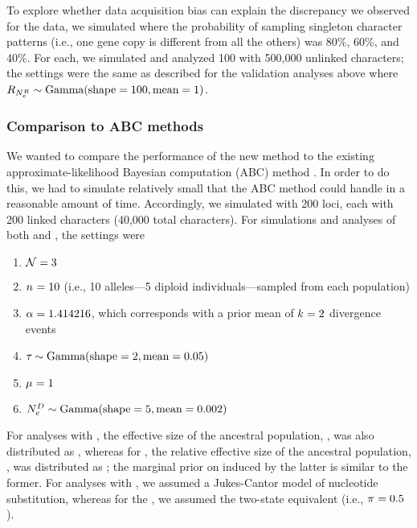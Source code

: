 To explore whether data acquisition bias can explain the discrepancy we
observed for the  data, we simulated \datasets where the probability
of sampling singleton character patterns (i.e., one gene copy is different from
all the others) was 80\%, 60\%, and 40\%.
For each, we simulated and analyzed 100 \datasets with 500,000 unlinked
characters; the settings were the same as described for the validation analyses
above where
$\rootrelativepopsize \sim \dgamma{100}{1}$.


\subsubsection{Comparison to ABC methods}
We wanted to compare the performance of the new method to the existing
approximate-likelihood Bayesian computation (ABC) method \dppmsbayes 
\citep{Oaks2014dpp}.
In order to do this, we had to simulate relatively small \datasets that the ABC
method could handle in a reasonable amount of time.
Accordingly, we simulated \datasets with 200 loci, each with 200 linked
characters (40,000 total characters).
For simulations and analyses of both \ecoevolity and \dppmsbayes, the settings
were
\begin{enumerate}
    \item $\ncomparisons = 3$
    \item $\allelecount = 10$ (i.e., 10 alleles---5 diploid
        individuals---sampled from each population)
    \item $\concentration = 1.414216$, which corresponds with a prior mean of
        $\nevents = 2$ divergence events
    \item $\divtime \sim \dgamma{2}{0.05}$
    \item $\murate = 1$
    \item $\epopsize[\descendantpopindex{}] \sim \dgamma{5}{0.002}$
\end{enumerate}
For analyses with \dppmsbayes, the effective size of the ancestral population,
\epopsize[\rootpopindex], was also distributed as , whereas
for \ecoevolity, the relative effective size of the ancestral population,
\rootrelativepopsize, was distributed as ;
the marginal prior on \epopsize[\rootpopindex] induced by the latter is similar
to the former.
For analyses with \dppmsbayes, we assumed a Jukes-Cantor model of nucleotide
substitution, whereas for the \ecoevolity, we assumed the two-state equivalent
(i.e., $\gfreq = 0.5$).


